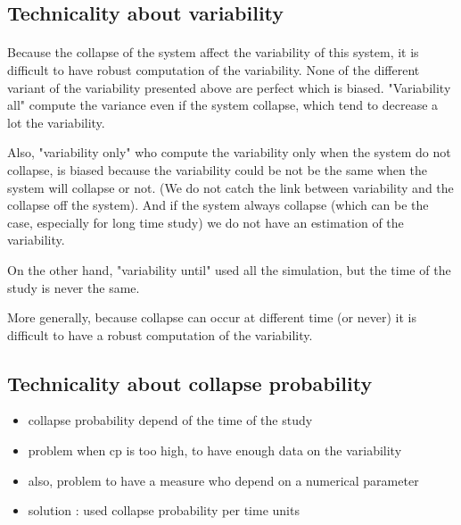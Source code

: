 \documentclass{article}
\begin{document}
\subsection{Technicality about variability}

\paragraph{}
Because the collapse of the system affect the variability of this system, it is difficult to have robust computation of the variability. None of the different variant of the variability presented above are perfect which is biased. "Variability all" compute the variance even if the system collapse, which tend to decrease a lot the variability. 
    
Also, "variability only" who compute the variability only when the system do not collapse, is biased because the variability could be not be the same when the system will collapse or not. (We do not catch the link between variability and the collapse off the system). And if the system always collapse (which can be the case, especially for long time study) we do not have an estimation of the variability. 

On the other hand, "variability until" used all the simulation, but the time of the study is never the same.

More generally, because collapse can occur at different time (or never) it is difficult to have a robust computation of the variability.



\subsection{Technicality about collapse probability}

\begin{itemize}
    \item collapse probability depend of the time of the study
    \item problem when cp is too high, to have enough data on the variability
    \item also, problem to have a measure who depend on a numerical parameter
    \item solution : used collapse probability per time units
\end{itemize}


\newpage
\end{document}

